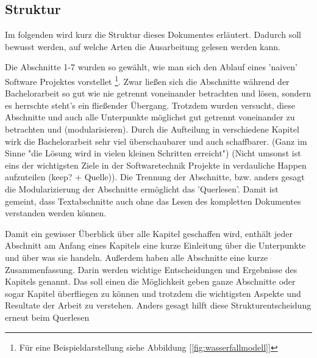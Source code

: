 \subsection{Struktur}
Im folgenden wird kurz die Struktur dieses Dokumentes erläutert. Dadurch soll bewusst werden, auf welche Arten die Ausarbeitung gelesen werden kann.

\myNewSection Die Abschnitte 1-7 wurden so gewählt, wie man sich den Ablauf eines 'naiven' Software Projektes vorstellet \footnote{Für eine Beispieldarstellung siehe Abbildung [\ref{fig:wasserfallmodell}]}. 
Zwar ließen sich die Abschnitte während der Bachelorarbeit so gut wie nie getrennt voneinander betrachten und lösen, sondern es herrschte steht's ein fließender Übergang. Trotzdem wurden versucht, diese Abschnitte und auch alle Unterpunkte möglichst gut getrennt voneinander zu betrachten und (modularisieren). 
Durch die Aufteilung in verschiedene Kapitel wirk die Bachelorarbeit sehr viel überschaubarer und auch schaffbarer. (Ganz im Sinne "die Lösung wird in vielen kleinen Schritten erreicht") (Nicht umsonst ist eins der wichtigsten Ziele in der Softwaretechnik Projekte in verdauliche Happen aufzuteilen (keep? + Quelle)). Die Trennung der Abschnitte, bzw. anders gesagt die Modularizierung der Abschnitte ermöglicht das 'Querlesen'. Damit ist gemeint, dass Textabschnitte auch ohne das Lesen des kompletten Dokumentes verstanden werden können. 

\myNewSection
Damit ein gewisser Überblick über alle Kapitel geschaffen wird, enthält jeder Abschnitt am Anfang eines Kapitels eine kurze Einleitung über die Unterpunkte und über was sie handeln.
Außerdem haben alle Abschnitte eine kurze Zusammenfassung. Darin werden wichtige Entscheidungen und Ergebnisse des Kapitels genannt. Das soll einen die Möglichkeit geben ganze Abschnitte oder sogar Kapitel überfliegen zu können und trotzdem die wichtigsten Aspekte und Resultate der Arbeit zu verstehen. Anders gesagt hilft diese Strukturentscheidung erneut beim Querlesen